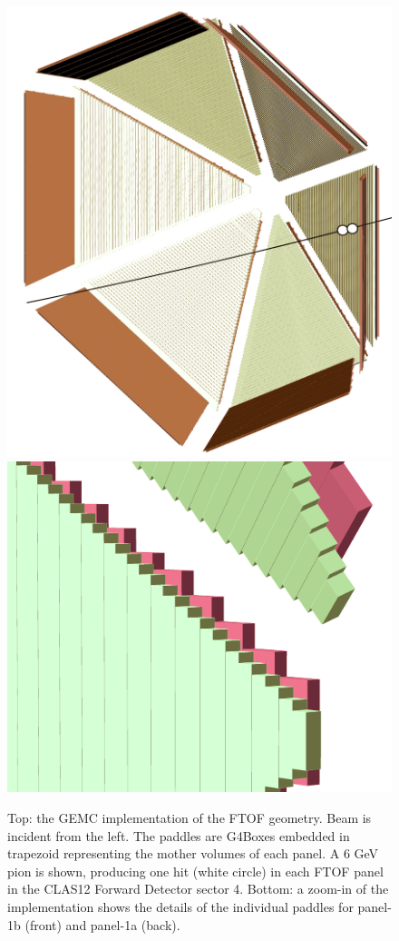 \begin{figure}
	\centering
	\includegraphics[width=0.99\columnwidth,keepaspectratio]{img/ftofGeometry.png}
	\includegraphics[width=0.99\columnwidth,keepaspectratio]{img/ftofDetail.png}
	\caption{Top: the GEMC implementation of the FTOF geometry. Beam is incident from the left. The paddles are G4Boxes embedded in trapezoid
             representing the mother volumes of each panel. A 6 GeV pion is shown, producing one hit (white circle) in each FTOF panel
             in the CLAS12 Forward Detector sector 4.
             Bottom: a zoom-in of the implementation shows the details of the individual paddles for panel-1b (front)
             and panel-1a (back). }
	\label{fig:ftofGeometry}
\end{figure}

